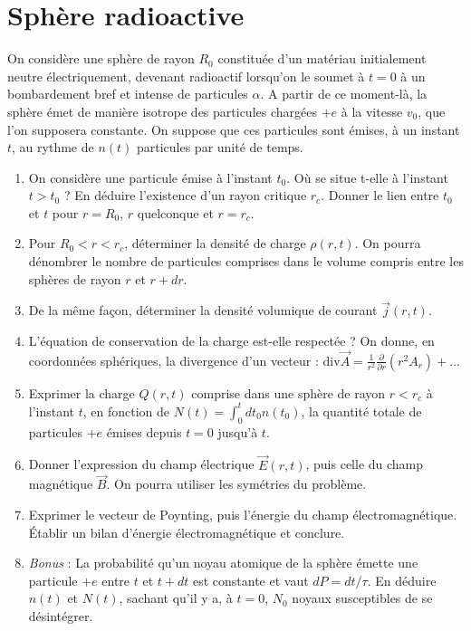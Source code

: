 \newpage

\section{Sphère radioactive}

On considère une sphère de rayon $R_0$ constituée d'un matériau initialement neutre électriquement, devenant radioactif lorsqu'on le soumet à $t=0$ à un bombardement bref et intense de particules $\alpha$. A partir de ce moment-là, la sphère émet de manière isotrope des particules chargées $+e$ à la vitesse $v_0$, que l'on supposera constante. On suppose que ces particules sont émises, à un instant $t$, au rythme de $n(t)$ particules par unité de temps.

\begin{enumerate}

	\item On considère une particule émise à l'instant $t_0$. Où se situe t-elle à l'instant $t>t_0$ ? En déduire l'existence d'un rayon critique $r_c$. Donner le lien entre $t_0$ et $t$ pour $r=R_0$, $r$ quelconque et $r=r_c$.
	
	\item Pour $R_0<r<r_c$, déterminer la densité de charge $\rho(r,t)$. On pourra dénombrer le nombre de particules comprises dans le volume compris entre les sphères de rayon $r$ et $r+dr$. 
	
	\item De la même façon, déterminer la densité volumique de courant $\vec{j}(r,t)$. 
	
	\item L'équation de conservation de la charge est-elle respectée ? On donne, en coordonnées sphériques, la divergence d'un vecteur : $\mathrm{div}\vec{A}=\frac{1}{r^2}\frac{\partial}{\partial r}\left(r^2A_r \right)+\ldots$ 
	
	\item Exprimer la charge $Q(r,t)$ comprise dans une sphère de rayon $r<r_c$ à l'instant $t$, en fonction de $N(t)=\int_0^t dt_0 n(t_0)$, la quantité totale de particules $+e$ émises depuis $t=0$ jusqu'à $t$.
	
	\item Donner l'expression du champ électrique $\vec{E}(r,t)$, puis celle du champ magnétique $\vec{B}$. On pourra utiliser les symétries du problème.
	
	\item Exprimer le vecteur de Poynting, puis l'énergie du champ électromagnétique. Établir un bilan d'énergie électromagnétique et conclure.
	
	\item \textit{Bonus} : La probabilité qu'un noyau atomique de la sphère émette une particule $+e$ entre $t$ et $t+dt$ est constante et vaut $dP=dt/\tau$. En déduire $n(t)$ et $N(t)$, sachant qu'il y a, à $t=0$, $N_0$ noyaux susceptibles de se désintégrer.

\end{enumerate}

